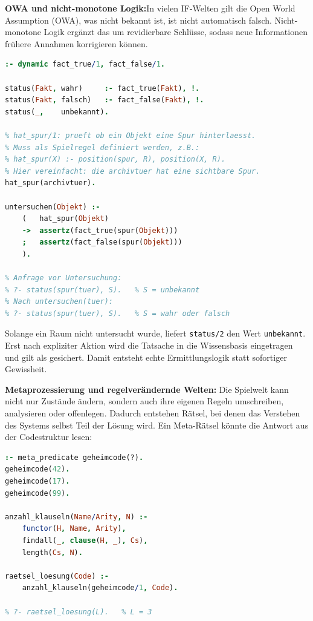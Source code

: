 \documentclass[parskip=half,a4paper,11pt]{scrreprt}
\begin{document}
\textbf{OWA und nicht-monotone Logik:}In vielen IF-Welten gilt die Open World Assumption (OWA), was nicht bekannt ist, ist nicht automatisch falsch. Nicht-monotone Logik ergänzt das um revidierbare Schlüsse, sodass neue Informationen frühere Annahmen korrigieren können.

\begin{lstlisting}[language=Prolog,caption={}]
:- dynamic fact_true/1, fact_false/1.

status(Fakt, wahr)     :- fact_true(Fakt), !.
status(Fakt, falsch)   :- fact_false(Fakt), !.
status(_,    unbekannt).

% hat_spur/1: prueft ob ein Objekt eine Spur hinterlaesst.
% Muss als Spielregel definiert werden, z.B.:
% hat_spur(X) :- position(spur, R), position(X, R).
% Hier vereinfacht: die archivtuer hat eine sichtbare Spur.
hat_spur(archivtuer).

untersuchen(Objekt) :-
    (   hat_spur(Objekt)
    ->  assertz(fact_true(spur(Objekt)))
    ;   assertz(fact_false(spur(Objekt)))
    ).

% Anfrage vor Untersuchung:
% ?- status(spur(tuer), S).   % S = unbekannt
% Nach untersuchen(tuer):
% ?- status(spur(tuer), S).   % S = wahr oder falsch
\end{lstlisting}

Solange ein Raum nicht untersucht wurde, liefert \texttt{status/2} den Wert \texttt{unbekannt}. Erst nach expliziter Aktion wird die Tatsache in die Wissensbasis eingetragen und gilt als gesichert. Damit entsteht echte Ermittlungslogik statt sofortiger Gewissheit.

\textbf{Metaprozessierung und regelverändernde Welten:} Die Spielwelt kann nicht nur Zustände ändern, sondern auch ihre eigenen Regeln umschreiben, analysieren oder offenlegen. Dadurch entstehen Rätsel, bei denen das Verstehen des Systems selbst Teil der Lösung wird. Ein Meta-Rätsel könnte die Antwort aus der Codestruktur lesen:

\begin{lstlisting}[language=Prolog,caption={}]
:- meta_predicate geheimcode(?).
geheimcode(42).
geheimcode(17).
geheimcode(99).

anzahl_klauseln(Name/Arity, N) :-
    functor(H, Name, Arity),
    findall(_, clause(H, _), Cs),
    length(Cs, N).

raetsel_loesung(Code) :-
    anzahl_klauseln(geheimcode/1, Code).

% ?- raetsel_loesung(L).   % L = 3
\end{lstlisting}
\end{document}
